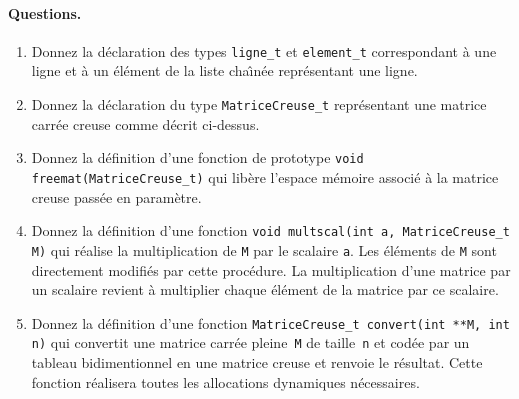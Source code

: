 \paragraph{Questions.}
\begin{enumerate}
\item Donnez la d\'eclaration des
  types \verb+ligne_t+ et \verb?element_t? correspondant \`a une ligne
  et \`a un \'el\'ement de la liste cha\^\i{}n\'ee repr\'esentant une
  ligne.
\item Donnez la d\'eclaration du type \verb?MatriceCreuse_t? repr\'esentant une
  matrice carr\'ee creuse comme d\'ecrit ci-dessus.
\item Donnez la d\'efinition d'une fonction de prototype
  \verb+void freemat(MatriceCreuse_t)+ qui lib\`ere l'espace m\'emoire
  associ\'e \`a la matrice creuse pass\'ee en param\`etre.
\item Donnez la d\'efinition d'une fonction
  \verb?void multscal(int a, MatriceCreuse_t M)? qui r\'ealise la
  multiplication de \verb?M? par le scalaire \verb?a?. Les
  \'el\'ements de \verb?M? sont directement modifi\'es par cette
  proc\'edure.  La multiplication d'une matrice par un scalaire
  revient \`a multiplier chaque \'el\'ement de la matrice par ce
  scalaire.


\item Donnez la d\'efinition d'une fonction
  \verb?MatriceCreuse_t convert(int **M, int n)? qui convertit une
  matrice carr\'ee pleine~\verb?M? de taille~\verb+n+ et cod\'ee par
  un tableau bidimentionnel en une matrice creuse et renvoie le
  r\'esultat. Cette fonction r\'ealisera toutes les allocations
  dynamiques n\'ecessaires. 


   
\end{enumerate}
